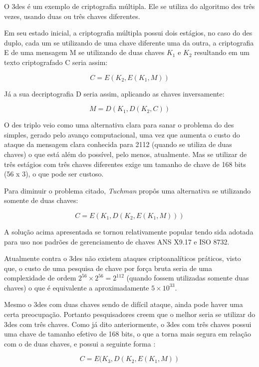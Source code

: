 O \acrfull{3des} é um exemplo de criptografia múltipla. Ele se utiliza do algoritmo \acrshort{des} três vezes, usando duas ou três chaves diferentes.

Em seu estado inicial, a criptografia múltipla possui dois estágios, no caso do \acrshort{des} duplo, cada um se utilizando de uma chave diferente uma da outra, a criptografia E de uma mensagem M se utilizando de duas chaves \(K_1\) e \(K_2\) resultando em um texto criptografado C seria assim:

\[C = E(K_2, E(K_1, M))\]

Já a sua decriptografia D seria assim, aplicando as chaves inversamente:

\[M = D(K_1, D(K_2, C))\]

O \acrshort{des} triplo veio como uma alternativa clara para sanar o problema do \acrshort{des} simples, gerado pelo avanço computacional, uma vez que aumenta o custo do ataque da mensagem clara conhecida para 2112 (quando se utiliza de duas chaves) o que está além do possível, pelo menos, atualmente. Mas se utilizar de três estágios com três chaves diferentes exige um tamanho de chave de 168 bits (56 x 3), o que pode ser custoso.

Para diminuir o problema citado, \textit{Tuchman} propôs uma alternativa se utilizando somente de duas chaves:

\[C = E(K_1, D(K_2, E(K_1, M)))\]

A solução acima apresentada se tornou relativamente popular tendo sida adotada para uso nos padrões de gerenciamento de chaves ANS X9.17 e ISO 8732.

Atualmente contra o \acrshort{3des} não existem ataques criptoanalíticos práticos, visto que, o custo de uma pesquisa de chave por força bruta seria de uma complexidade de ordem \(2^{56} \times 2^{56} = 2^{112}\) (quando fossem utilizadas somente duas chaves) o que é equivalente a aproximadamente \(5 \times 10^{33}\).

Mesmo o \acrshort{3des} com duas chaves sendo de difícil ataque, ainda pode haver uma certa preocupação. Portanto pesquisadores creem que o melhor seria se utilizar do \acrshort{3des} com três chaves. Como já dito anteriormente, o \acrshort{3des} com três chaves possui uma chave de tamanho efetivo de 168 bits, o que a torna mais segura em relação com o de duas chaves, e possui a seguinte forma \cite{stallings14}:

\[C = E(K_3, D(K_2, E(K_1, M))\]

